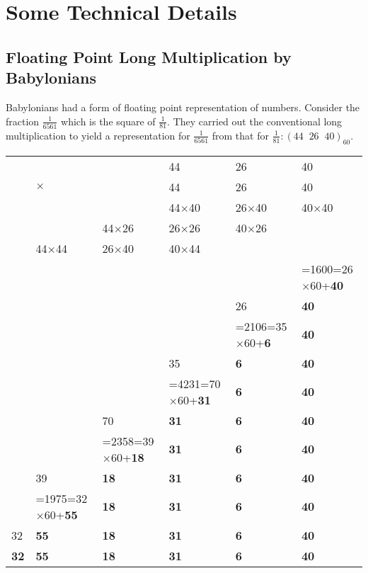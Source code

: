 \chapter{Some Technical Details}

\section{Floating Point Long Multiplication by Babylonians}
\label{app:baby-long-mult}

Babylonians had a form of floating point representation of numbers. Consider the fraction $\frac{1}{6561}$ which is the square of $\frac{1}{81}$. They carried out the conventional long multiplication to yield a representation for $\frac{1}{6561}$ from that for $\frac{1}{81}: (44\;\;26\;\;40)_{60}$.

\begin{table}[h!]
\label{tab:square-of-6561}
\centering
\setlength{\tabcolsep}{4pt} %
\renewcommand{\arraystretch}{1.25} %
\begin{tabular}{@{}llllll@{}}
  &&& 44 & 26 & 40 \\
  &$\times$ && 44 & 26 & 40 \\\hline
  &&& 44$\times$40 & 26$\times$40 & 40$\times$40 \\  
  && 44$\times$26 & 26$\times$26 & 40$\times$26 & \\ 
  &44$\times$44 & 26$\times$40 & 40$\times$44 && \\\hline
  &&&&&=1600={\color{red}26}$\times$60+\textbf{40}\\
  &&&&{\color{red}26}&\textbf{40}\\
  &&&&=2106={\color{red}35}$\times$60+\textbf{6}&\textbf{40}\\
  &&&{\color{red}35}&\textbf{6}&\textbf{40}\\
  &&&=4231={\color{red}70}$\times$60+\textbf{31}&\textbf{6}&\textbf{40}\\
  &&{\color{red}70}&\textbf{31}&\textbf{6}&\textbf{40}\\
  &&=2358={\color{red}39}$\times$60+\textbf{18}&\textbf{31}&\textbf{6}&\textbf{40}\\
  &{\color{red}39}&\textbf{18}&\textbf{31}&\textbf{6}&\textbf{40}\\
  &=1975={\color{red}32}$\times$60+\textbf{55}&\textbf{18}&\textbf{31}&\textbf{6}&\textbf{40}\\
  {\color{red}32}&\textbf{55}&\textbf{18}&\textbf{31}&\textbf{6}&\textbf{40}\\\hline
  \textbf{32}&\textbf{55}&\textbf{18}&\textbf{31}&\textbf{6}&\textbf{40}\\\hline
\end{tabular}
\end{table}

